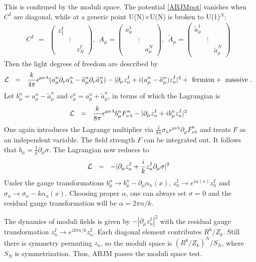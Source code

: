 \documentclass[12pt]{article}
\def\be{\begin{eqnarray}}\def\ba{\begin{eqnarray}}
\def\ee{\end{eqnarray}}\def\ea{\end{eqnarray}}
\def\calL{{\cal L}}\def\calF{{\cal F}}
\begin{document}
This is confirmed by the moduli space. 
The potential \eqref{ABJMpot} vanishes when $C^I$ are diagonal, while at a generic point U(N)$\times$U(N) is broken to U(1)$^N$: 
\be
C^I ~~=~~ \left(\begin{array}{ccc}
z_1^I&&\\
&\vdots&\\
&&z_N^I 
\end{array}
\right)
, ~~ 
A_\mu = \left(\begin{array}{ccc}
a^1_\mu&&\\
&\vdots&\\
&&a^N_\mu
\end{array}
\right)
,~~
\tilde{A}_\mu= \left(\begin{array}{ccc}
\tilde{a}^1_\mu&&\\
&\vdots&\\
&&\tilde{a}^N_\mu 
\end{array}
\right)
\ee
Then the light degrees of freedom are described by
\be
\calL~~=~~\frac{k}{4\pi}\epsilon^{\mu\nu\lambda}(a^n_\mu \partial_\nu a^n_\lambda- \tilde{a}^n_\mu \partial_\nu \tilde{a}^n_\lambda)-
			|\partial_\mu z_n^I + i(a^n_\mu-\tilde{a}^n_\mu)z^I_n|^2 + ~{\mathrm{fermion}}+~{\mathrm{massive}}~.
\ee
Let  $b_\mu^n=a^n_\mu-\tilde{a}^n_\mu$ and $c_\mu^n=a^n_\mu+\tilde{a}^n_\mu$, in terms of which the Lagrangian is
\be
\calL~~=~~\frac{k}{8\pi}\epsilon^{\mu\nu\lambda}b_\mu^n F_{\nu\lambda}^n -|\partial_\mu z_n^I + i b^n_\mu z^I_n|^2 
\ee
One again introduces the Lagrange multiplier via $\frac{1}{8\pi}\sigma_n\epsilon^{\mu\nu\lambda} \partial_\mu F_{\nu\lambda}^n$ and treats $F$ as an independent variable. 
The field strength $F$ can be integrated out. It follows that $b_\mu = \frac{1}{k}\partial_\mu \sigma$. 
The Lagrangian now reduces to
\be
\calL~~=~~-|\partial_\mu z_n^I + \frac{i}{k} z^I_n \partial_\mu \sigma|^2 
\ee
Under the gauge transformations $b_\mu^n \rightarrow b_\mu^n -\partial_\mu \alpha_n(x) $, $z_n^I \rightarrow e^{i \alpha(x)} z_n^I$ and $\sigma_n \rightarrow \sigma_n - k \alpha_n(x)$. 
Choosing proper $\alpha$, one can always set $\sigma$ = 0 and the residual gauge transformation will be $\alpha = 2\pi n /k$. 

The dynamics of moduli fields is given by $-|\partial_\mu z_n^I |^2$ with the residual gauge transformation $z_n^I \rightarrow e^{i 2\pi n /k} z_n^I$. 
Each diagonal element contributes $R^8/Z_k$. Still there is symmetry permuting $ z_n $, so the moduli space is $(R^8/Z_k)^N/S_N$, where $S_N$ is symmetrization.
Thus, ABJM passes the moduli space test.
\end{document}
